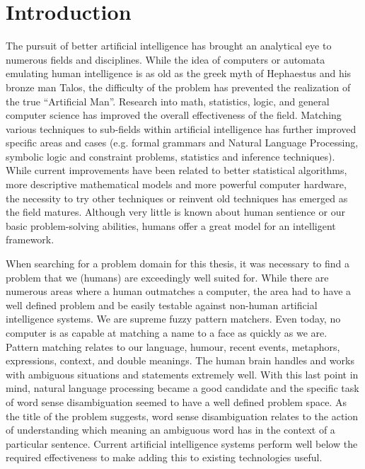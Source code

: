 \chapter{Introduction}

The pursuit of better artificial intelligence has brought an analytical eye to
numerous fields and disciplines.  While the idea of computers or automata
emulating human intelligence is as old as the greek myth of Hephaestus and his
bronze man Talos\cite{TALOS}, the difficulty of the problem has prevented the 
realization of the true ``Artificial Man''.  Research into math, statistics, logic, and general
computer science has improved the overall effectiveness of the field. Matching
various techniques to sub-fields within artificial intelligence has further
improved specific areas and cases (e.g. formal grammars and Natural Language
Processing, symbolic logic and constraint problems, statistics and inference
techniques). While current improvements have been related to better statistical
algorithms, more descriptive mathematical models and more powerful computer
hardware, the necessity to try other techniques or reinvent old techniques has
emerged as the field matures.  Although very little is known about human
sentience or our basic problem-solving abilities, humans offer a great model for
an intelligent framework.

When searching for a problem domain for this thesis, it was necessary to find a
problem that we (humans) are exceedingly well suited for.  While there are
numerous areas where a human outmatches a computer, the area had to have a well
defined problem and be easily testable against non-human artificial intelligence
systems.  We are supreme fuzzy pattern matchers.  Even today, no computer is as
capable at matching a name to a face as quickly as we are.  Pattern matching relates
to our language, humour, recent events, metaphors, expressions, context, and
double meanings. The human brain handles and works with ambiguous situations and
statements extremely well.  With this last point in mind, natural
language processing became a good candidate and the specific task of word sense disambiguation seemed
to have a well defined problem space.  As the title of the problem suggests,
word sense disambiguation relates to the action of understanding which meaning
an ambiguous word has in the context of a particular sentence. Current
artificial intelligence systems perform well below the required effectiveness to
make adding this to existing technologies useful.

